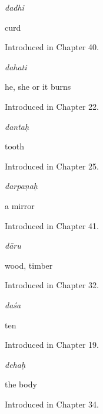 \noindent\begin{minipage}[t]{\linewidth}
\raggedright
\textbf{}\enspace\emph{dadhi}\par
\small curd\par
\footnotesize Introduced in Chapter 40.
\end{minipage}\par\medskip

\noindent\begin{minipage}[t]{\linewidth}
\raggedright
\textbf{}\enspace\emph{dahati}\par
\small he, she or it burns\par
\footnotesize Introduced in Chapter 22.
\end{minipage}\par\medskip

\noindent\begin{minipage}[t]{\linewidth}
\raggedright
\textbf{}\enspace\emph{dantaḥ}\par
\small tooth\par
\footnotesize Introduced in Chapter 25.
\end{minipage}\par\medskip

\noindent\begin{minipage}[t]{\linewidth}
\raggedright
\textbf{}\enspace\emph{darpaṇaḥ}\par
\small a mirror\par
\footnotesize Introduced in Chapter 41.
\end{minipage}\par\medskip

\noindent\begin{minipage}[t]{\linewidth}
\raggedright
\textbf{}\enspace\emph{dāru}\par
\small wood, timber\par
\footnotesize Introduced in Chapter 32.
\end{minipage}\par\medskip

\noindent\begin{minipage}[t]{\linewidth}
\raggedright
\textbf{}\enspace\emph{daśa}\par
\small ten\par
\footnotesize Introduced in Chapter 19.
\end{minipage}\par\medskip

\noindent\begin{minipage}[t]{\linewidth}
\raggedright
\textbf{}\enspace\emph{dehaḥ}\par
\small the body\par
\footnotesize Introduced in Chapter 34.
\end{minipage}\par\medskip

